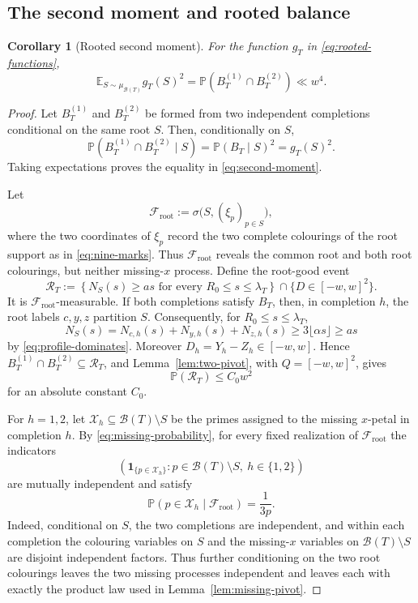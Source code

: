\documentclass[11pt]{article}
\numberwithin{equation}{section}
\theoremstyle{plain}
\newtheorem{corollary}[theorem]{Corollary}
\newcommand{\Pp}{\mathbb P}
\newcommand{\E}{\mathbb E}
\newcommand{\1}{\mathbf 1}
\newcommand{\cB}{\mathcal B}
\begin{document}
\subsection{The second moment and rooted balance}

\begin{corollary}[Rooted second moment]\label{cor:rooted-second-moment}
For the function $g_T$ in \eqref{eq:rooted-functions},
\begin{equation}\label{eq:second-moment}
 \E_{S\sim\mu_{\cB(T)}}g_T(S)^2
 =\Pp(B_T^{(1)}\cap B_T^{(2)})
 \ll w^4.
\end{equation}
\end{corollary}

\begin{proof}
Let $B_T^{(1)}$ and $B_T^{(2)}$ be formed from two independent
completions conditional on the same root $S$.  Then, conditionally on $S$,
\[
 \Pp(B_T^{(1)}\cap B_T^{(2)}\mid S)
 =\Pp(B_T\mid S)^2=g_T(S)^2.
\]
Taking expectations proves the equality in \eqref{eq:second-moment}.

Let
\[
 \mathcal F_{\mathrm{root}}
 :=\sigma\bigl(S,(\xi_p)_{p\in S}\bigr),
\]
where the two coordinates of $\xi_p$ record the two complete colourings
of the root support as in \eqref{eq:nine-marks}.  Thus
$\mathcal F_{\mathrm{root}}$ reveals the common root and both root
colourings, but neither missing-$x$ process.  Define the root-good event
\[
 \mathcal R_T:=
 \left\{
 N_S(s)\ge as\text{ for every }R_0\le s\le\lambda_T
 \right\}
 \cap\{D\in[-w,w]^2\}.
\]
It is $\mathcal F_{\mathrm{root}}$-measurable.  If both completions satisfy
$B_T$, then, in completion $h$, the root labels $c,y,z$ partition $S$.
Consequently, for $R_0\le s\le\lambda_T$,
\[
 N_S(s)
 =N_{c,h}(s)+N_{y,h}(s)+N_{z,h}(s)
 \ge3\lfloor\alpha s\rfloor
 \ge as
\]
by \eqref{eq:profile-dominates}.  Moreover
$D_h=Y_h-Z_h\in[-w,w]$.  Hence
$B_T^{(1)}\cap B_T^{(2)}\subseteq\mathcal R_T$, and
Lemma~\ref{lem:two-pivot}, with $Q=[-w,w]^2$, gives
\begin{equation}\label{eq:root-good-probability}
 \Pp(\mathcal R_T)\le C_0w^2
\end{equation}
for an absolute constant $C_0$.

For $h=1,2$, let $\mathcal X_h\subseteq\cB(T)\setminus S$ be the primes
assigned to the missing $x$-petal in completion $h$.  By
\eqref{eq:missing-probability}, for every fixed realization of
$\mathcal F_{\mathrm{root}}$ the indicators
\[
 \left(
 \1_{\{p\in\mathcal X_h\}}:
 p\in\cB(T)\setminus S,\ h\in\{1,2\}
 \right)
\]
are mutually independent and satisfy
\[
 \Pp(p\in\mathcal X_h\mid\mathcal F_{\mathrm{root}})=\frac1{3p}.
\]
Indeed, conditional on $S$, the two completions are independent, and
within each completion the colouring variables on $S$ and the
missing-$x$ variables on $\cB(T)\setminus S$ are disjoint independent
factors.  Thus further conditioning on the two root colourings leaves the
two missing processes independent and leaves each with exactly the
product law used in Lemma~\ref{lem:missing-pivot}.


\end{proof}
\end{document}
